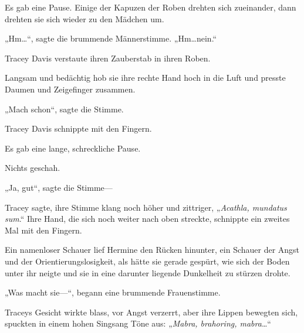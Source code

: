 Es gab eine Pause. Einige der Kapuzen der Roben drehten sich zueinander, dann drehten sie sich wieder zu den Mädchen um.

„Hm…“, sagte die brummende Männerstimme. „Hm…nein.“

Tracey Davis verstaute ihren Zauberstab in ihren Roben.

Langsam und bedächtig hob sie ihre rechte Hand hoch in die Luft und presste Daumen und Zeigefinger zusammen.

„Mach schon“, sagte die Stimme.

Tracey Davis schnippte mit den Fingern.

Es gab eine lange, schreckliche Pause.

Nichts geschah.

„Ja, gut“, sagte die Stimme—

Tracey sagte, ihre Stimme klang noch höher und zittriger, „\emph{Acathla, mundatus sum}.“ Ihre Hand, die sich noch weiter nach oben streckte, schnippte ein zweites Mal mit den Fingern.

Ein namenloser Schauer lief Hermine den Rücken hinunter, ein Schauer der Angst und der Orientierungslosigkeit, als hätte sie gerade gespürt, wie sich der Boden unter ihr neigte und sie in eine darunter liegende Dunkelheit zu stürzen drohte.

„Was macht sie—“, begann eine brummende Frauenstimme.

Traceys Gesicht wirkte blass, vor Angst verzerrt, aber ihre Lippen bewegten sich, spuckten in einem hohen Singsang Töne aus: „\emph{Mabra, brahoring, mabra}…“

